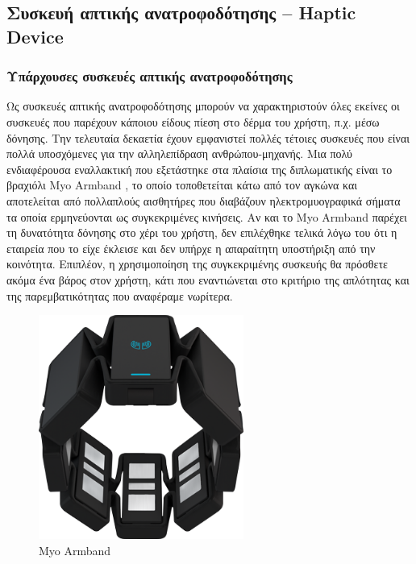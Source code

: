 \subsection{Συσκευή απτικής ανατροφοδότησης – Haptic Device}
\subsubsection{Υπάρχουσες συσκευές απτικής ανατροφοδότησης}
Ως συσκευές απτικής ανατροφοδότησης μπορούν να χαρακτηριστούν όλες εκείνες οι συσκευές που παρέχουν κάποιου είδους πίεση στο δέρμα του χρήστη, π.χ. μέσω δόνησης. Την τελευταία δεκαετία έχουν εμφανιστεί πολλές τέτοιες συσκευές που είναι πολλά υποσχόμενες για την αλληλεπίδραση ανθρώπου-μηχανής. Μια πολύ ενδιαφέρουσα εναλλακτική που εξετάστηκε στα πλαίσια της διπλωματικής είναι το βραχιόλι Myo Armband \cite{MyoGestu49:online}, το οποίο τοποθετείται κάτω από τον αγκώνα και αποτελείται από πολλαπλούς αισθητήρες που διαβάζουν ηλεκτρομυογραφικά σήματα τα οποία ερμηνεύονται ως συγκεκριμένες κινήσεις. Αν και το Myo Armband παρέχει τη δυνατότητα δόνησης στο χέρι του χρήστη, δεν επιλέχθηκε τελικά λόγω του ότι η εταιρεία που το είχε έκλεισε και δεν υπήρχε η απαραίτητη υποστήριξη από την κοινότητα. Επιπλέον, η χρησιμοποίηση της συγκεκριμένης συσκευής θα πρόσθετε ακόμα ένα βάρος στον χρήστη, κάτι που εναντιώνεται στο κριτήριο της απλότητας και της παρεμβατικότητας που αναφέραμε νωρίτερα.

\begin{figure}[H]
    \centering
    \includegraphics[width=0.6\textwidth]{images/myo_image_black.png}
    \caption{Myo Armband}
    \label{fig:myo}
\end{figure}

